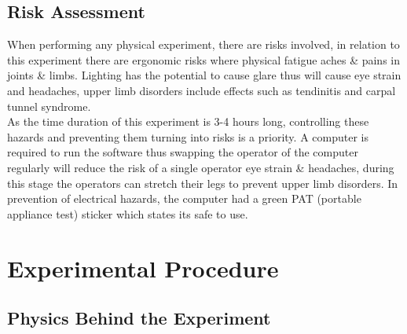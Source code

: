 \documentclass[11pt]{article}
\begin{document}
\begin{multicols}{2}

\subsection{Risk Assessment}

When performing any physical experiment, there are risks involved, in relation to this experiment there are ergonomic risks where physical fatigue aches \& pains in joints \& limbs. Lighting has the potential to cause glare thus will cause eye strain and headaches, upper limb disorders include effects such as tendinitis and carpal tunnel syndrome. \\

As the time duration of this experiment is 3-4 hours long, controlling these hazards and preventing them turning into risks is a priority. A computer is required to run the software thus swapping the operator of the computer regularly will reduce the risk of a single operator eye strain \& headaches, during this stage the operators can stretch their legs to prevent upper limb disorders. In prevention of electrical hazards, the computer had a green PAT (portable appliance test) sticker which states its safe to use. 


\section{Experimental Procedure}


\subsection{Physics Behind the Experiment} \label{Physics Behind the Experiment}


\end{multicols}
\end{document}
